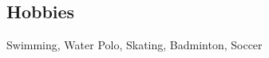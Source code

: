 \documentclass[line,margin,letter]{resume}
\begin{document}
\begin{resume}
    
    
    

 


    
\section{\mysidestyle Hobbies}
    Swimming, Water Polo, Skating, Badminton, Soccer

\end{resume}
\end{document}
